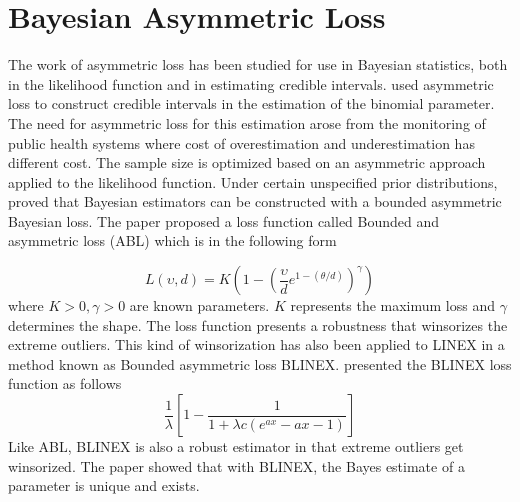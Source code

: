 \section{Bayesian Asymmetric Loss}
The work of asymmetric loss has been studied for use in Bayesian statistics, both in the likelihood function and in estimating credible intervals. \citet{Hans06} used asymmetric loss to construct credible intervals in the estimation of the binomial parameter. The need for asymmetric loss for this estimation arose from the monitoring of public health systems where cost of overestimation and underestimation has different cost. The sample size is optimized based on an asymmetric approach applied to the likelihood function. Under certain unspecified prior distributions, \citet{Kaminska09} proved that Bayesian estimators can be constructed with a bounded asymmetric Bayesian loss. The paper proposed a loss function called Bounded and asymmetric loss (ABL) which is in the following form

\begin{equation}
	L(\upsilon, d)= K(1-(\frac{\upsilon}{d}e^{1-(\theta/d)})^\gamma)
\end{equation}
where $K >0, \gamma > 0$ are known parameters. $K$ represents the maximum loss and $\gamma$ determines the shape. The loss function presents a robustness that winsorizes the extreme outliers. This kind of winsorization has also been applied to LINEX in a method known as Bounded asymmetric loss BLINEX. \citet{Wen01} presented the BLINEX loss function as follows 
\begin{equation}
	\frac{1}{\lambda} \left [ 1-\frac{1}{1+\lambda c(e^{ax}-ax-1)} \right ]
\end{equation}
Like ABL, BLINEX is also a robust estimator in that extreme outliers get winsorized. The paper showed that with BLINEX, the Bayes estimate of a parameter is unique and exists.

